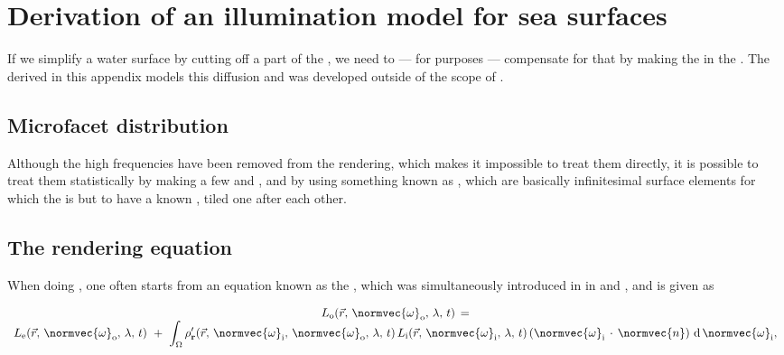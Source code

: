 \chapter{Derivation of an illumination model for sea surfaces}
\label{chap:illumination_model_derivation}

{
If we simplify a water surface by cutting off a part of the , we need to --- for \rendering purposes --- compensate for that by making the  in the  . The  derived in this appendix models this diffusion and was developed outside of the scope of \thismasterthesiswork.

\section{Microfacet distribution}

Although the high frequencies have been removed from the rendering, which makes it impossible to treat them directly, it is possible to treat them statistically by making a few \assumptions and \approximations, and by using something known as \microfacets, which are basically infinitesimal surface elements for which the  is \stochastic but \assumed to have a known , tiled one after each other.

\section{The rendering equation}

When doing , one often starts from an equation known as the , which was simultaneously introduced in  in \citep{temp} and \citep{temp}, and is given as

\begin{equation} \label{eq:rendering_equation_original}
\begin{array}{c}
L_{\text{o}}(\vec{r},\,\normvec{\omega}_{\text{o}},\, \lambda,\, t) \,= \\
\displaystyle L_{\text{e}}(\vec{r},\, \normvec{\omega}_{\text{o}},\, \lambda,\, t) \ + \ \int_\Omega \rho'_{\textbf{r}}(\vec{r},\, \normvec{\omega}_{\text{i}},\, \normvec{\omega}_{\text{o}},\, \lambda,\, t)\, L_{\text{i}}(\vec{r},\, \normvec{\omega}_{\text{i}},\, \lambda,\, t)\, (\normvec{\omega}_{\text{i}}\,\cdot\,\normvec{n})\, \operatorname d \normvec{\omega}_{\text{i}},
\end{array}
\end{equation}

}
